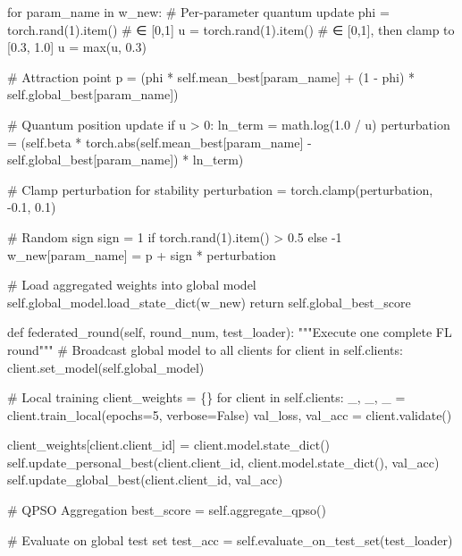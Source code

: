         for param\_name in w\_new:
            \# Per-parameter quantum update
            phi = torch.rand(1).item()  \# ∈ [0,1]
            u = torch.rand(1).item()  \# ∈ [0,1], then clamp to [0.3, 1.0]
            u = max(u, 0.3)
            
            \# Attraction point
            p = (phi * self.mean\_best[param\_name] + 
                 (1 - phi) * self.global\_best[param\_name])
            
            \# Quantum position update
            if u > 0:
                ln\_term = math.log(1.0 / u)
                perturbation = (self.beta * 
                               torch.abs(self.mean\_best[param\_name] - 
                                        self.global\_best[param\_name]) * 
                               ln\_term)
                
                \# Clamp perturbation for stability
                perturbation = torch.clamp(perturbation, -0.1, 0.1)
                
                \# Random sign
                sign = 1 if torch.rand(1).item() > 0.5 else -1
                w\_new[param\_name] = p + sign * perturbation
        
        \# Load aggregated weights into global model
        self.global\_model.load\_state\_dict(w\_new)
        return self.global\_best\_score
    
    def federated\_round(self, round\_num, test\_loader):
        """Execute one complete FL round"""
        \# Broadcast global model to all clients
        for client in self.clients:
            client.set\_model(self.global\_model)
        
        \# Local training
        client\_weights = \{\}
        for client in self.clients:
            \_, \_, \_ = client.train\_local(epochs=5, verbose=False)
            val\_loss, val\_acc = client.validate()
            
            client\_weights[client.client\_id] = client.model.state\_dict()
            self.update\_personal\_best(client.client\_id, 
                                     client.model.state\_dict(), 
                                     val\_acc)
            self.update\_global\_best(client.client\_id, val\_acc)
        
        \# QPSO Aggregation
        best\_score = self.aggregate\_qpso()
        
        \# Evaluate on global test set
        test\_acc = self.evaluate\_on\_test\_set(test\_loader)
        
